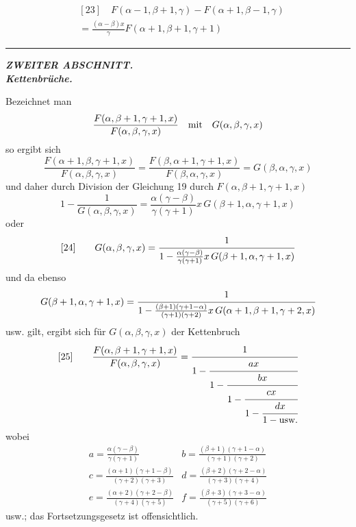 \[
\begin{aligned}&[23]\quad F(\alpha-1,\beta+1,\gamma)-F(\alpha+1,\beta-1,\gamma)\\&{}=\frac{(\alpha-\beta)x}{\gamma}F(\alpha+1,\beta+1,\gamma+1)
\end{aligned}
\]
\begin{center}\rule{.24\linewidth}{.3pt}\end{center}
\par{}\begin{center}\textbf{\textit{ZWEITER ABSCHNITT.}}\\[6pt]\textbf{\textit{Kettenbrüche.}}\end{center}
Bezeichnet man
\[
\frac{F(\alpha,\beta+1,\gamma+1,x)}{F(\alpha,\beta,\gamma,x)}\quad\hbox{mit}\quad G(\alpha,\beta,\gamma,x)
\]
so ergibt sich
\[
\frac{F(\alpha+1,\beta,\gamma+1,x)}{F(\alpha,\beta,\gamma,x)}=\frac{F(\beta,\alpha+1,\gamma+1,x)}{F(\beta,\alpha,\gamma,x)}=G(\beta,\alpha,\gamma,x)
\]
und daher durch Division der Gleichung 19 durch $F(\alpha,\beta+1,\gamma+1,x)$
\[
1-\frac{1}{G(\alpha,\beta,\gamma,x)}=\frac{\alpha(\gamma-\beta)}{\gamma(\gamma+1)}x\,G(\beta+1,\alpha,\gamma+1,x)
\]
oder
\[
[24]\qquad G(\alpha,\beta,\gamma,x)=\cfrac{1}{1-\frac{\alpha(\gamma-\beta)}{\gamma(\gamma+1)}x\,G(\beta+1,\alpha,\gamma+1,x)}
\]
und da ebenso
\[
G(\beta+1,\alpha,\gamma+1,x)=\cfrac{1}{1-\frac{(\beta+1)(\gamma+1-\alpha)}{(\gamma+1)(\gamma+2)}x\,G(\alpha+1,\beta+1,\gamma+2,x)}
\]
usw. gilt, ergibt sich für $G(\alpha,\beta,\gamma,x)$ der Kettenbruch
\[
[25]\qquad\frac{F(\alpha,\beta+1,\gamma+1,x)}{F(\alpha,\beta,\gamma,x)}=\cfrac{1}{1-\cfrac{ax}{1-\cfrac{bx}{1-\cfrac{cx}{1-\cfrac{dx}{1-\hbox{usw.}}}}}}
\]
wobei
\[
\begin{array}{ll}
a=\frac{\alpha(\gamma-\beta)}{\gamma(\gamma+1)}&b=\frac{(\beta+1)(\gamma+1-\alpha)}{(\gamma+1)(\gamma+2)}\\[6pt]
c=\frac{(\alpha+1)(\gamma+1-\beta)}{(\gamma+2)(\gamma+3)}&d=\frac{(\beta+2)(\gamma+2-\alpha)}{(\gamma+3)(\gamma+4)}\\[6pt]
e=\frac{(\alpha+2)(\gamma+2-\beta)}{(\gamma+4)(\gamma+5)}&f=\frac{(\beta+3)(\gamma+3-\alpha)}{(\gamma+5)(\gamma+6)}
\end{array}
\]
usw.; das Fortsetzungsgesetz ist offensichtlich.

